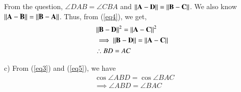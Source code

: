 \documentclass[journal,12pt,twocolumn]{IEEEtran}
\begin{document}
From the question, $\angle DAB = \angle CBA$ and $\left\lVert\mathbf{A}-\mathbf{D}\right\rVert = \left\lVert\mathbf{B}-\mathbf{C}\right\rVert$. We also know $\left\lVert\mathbf A -\mathbf B\right\rVert= \left\lVert \mathbf B- \mathbf A\right\rVert$. 
Thus, from (\ref{eq4}), we get,
\begin{align}
	& \left\lVert\mathbf{B}-\mathbf{D}\right\rVert^2 = \left\lVert\mathbf{A}-\mathbf{C}\right\rVert^2 \\
	& \implies\label{eq5}\left\lVert\mathbf{B}-\mathbf{D}\right\rVert = \left\lVert\mathbf{A}-\mathbf{C}\right\rVert\\
	& \therefore BD=AC
\end{align}

c)  From (\ref{eq3}) and (\ref{eq5}), we have
\begin{align}
	& \cos\angle ABD = \cos\angle BAC \\
	& \implies\angle ABD = \angle BAC
\end{align}
\end{document}
